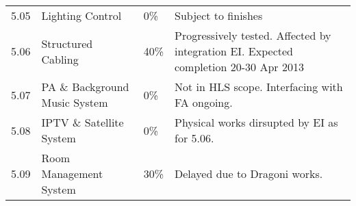 {\begin{longtable}{lllp{4.3cm}@{}}
5.05	&Lighting Control		&0\%&Subject to finishes\\

5.06	&Structured Cabling		&40\%&Progressively tested. Affected by integration EI. Expected completion 20-30 Apr 2013\\

5.07	&PA \& Background Music System &0\%& Not in HLS scope. Interfacing with  FA ongoing.\\		
5.08	&IPTV \& Satellite System	&0\%&Physical works dirsupted by EI as for 5.06.\\	
5.09	&Room Management System	&30\%&Delayed due to Dragoni works.\\

\bottomrule
\end{longtable}
}

